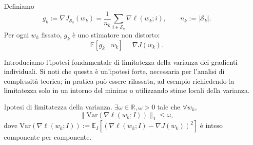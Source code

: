 \documentclass[a4paper,12pt]{article}
\begin{document}
Definiamo
\[
g_k := \nabla J_{\mathcal{S}_k}(w_k) = \frac{1}{n_k}\sum_{i\in \mathcal{S}_k}\nabla \ell(w_k;i), \qquad n_k := |\mathcal{S}_k|. \tag{3.2}
\]
Per ogni \(w_k\) fissato, \(g_k\) è uno stimatore non distorto:
\[
\mathbb{E}[g_k \mid w_k] = \nabla J(w_k). \tag{3.3}
\]

Introduciamo l'ipotesi fondamentale di limitatezza della varianza dei gradienti individuali. Si noti che questa \`e un'ipotesi forte, necessaria per l'analisi di complessit\`a teorica; in pratica pu\`o essere rilassata, ad esempio richiedendo la limitatezza solo in un intorno del minimo o utilizzando stime locali della varianza.

\begin{notebox}
  Ipotesi di limitatezza della varianza.
   \(\exists \omega \in \mathbb{R},\omega > 0\) tale che \(\forall w_k\),
  \[
  \|\mathrm{Var}(\nabla \ell(w_k;I))\|_1 \le \omega, \tag{3.4}
  \]
  dove \(\mathrm{Var}(\nabla \ell(w_k;I)) := \mathbb{E}_I[(\nabla \ell(w_k;I) - \nabla J(w_k))^2]\) è inteso componente per componente.
\end{notebox}
\end{document}
